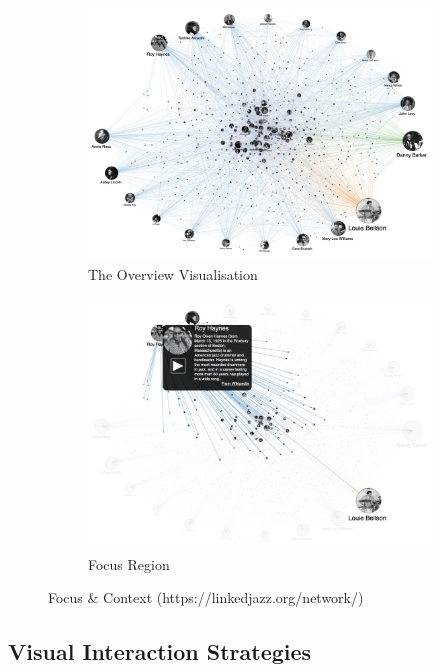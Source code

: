 \begin{figure}[h]
\begin{subfigure}{.5\textwidth}
  \centering
  \captionsetup{justification=centering}
  \includegraphics[width=.8\linewidth]{Report-latex/tex_files/pics/f1.png}  
  \caption{The Overview Visualisation}
  \label{fig:sub-first}
\end{subfigure}
\begin{subfigure}{.5\textwidth}
  \centering
  \captionsetup{justification=centering}
  \includegraphics[width=.8\linewidth]{Report-latex/tex_files/pics/f2.png}  
  \caption{Focus Region}
  \label{fig:sub-second}
\end{subfigure}
\captionsetup{justification=centering}
\caption{Focus \& Context (https://linkedjazz.org/network/) }
\label{fig:fig}
\end{figure}

\subsection{Visual Interaction Strategies}

